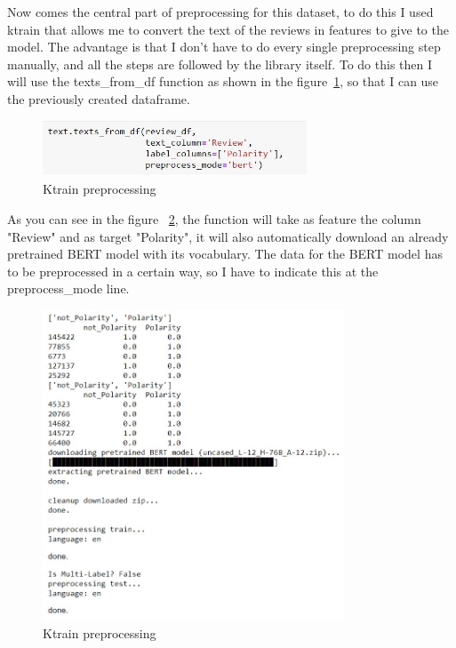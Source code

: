 Now comes the central part of preprocessing for this dataset, to do this I used ktrain that allows me to convert the text of the reviews in features to give to the model.
The advantage is that I don't have to do every single preprocessing step manually, and all the steps are followed by the library itself.
To do this then I will use the texts\_from\_df function as shown in the figure~\ref{fig:fig_07}, so that I can use the previously created dataframe.

\begin{figure}[H]
\centering
\includegraphics[width=0.7\textwidth]{images/preprocktrain.jpg}
\caption{Ktrain preprocessing}
\label{fig:fig_07}
\end{figure}
\FloatBarrier
\newpage
As you can see in the figure ~\ref{fig:fig_08}, the function will take as feature the column "Review" and as target "Polarity", it will also automatically download an already pretrained BERT model with its vocabulary.
The data for the BERT model has to be preprocessed in a certain way, so I have to indicate this at the preprocess\_mode line.

\begin{figure}[H]
\centering
\includegraphics[width=0.8\textwidth]{images/preprocktrain2.jpg}
\caption{Ktrain preprocessing}
\label{fig:fig_08}
\end{figure}
\FloatBarrier

